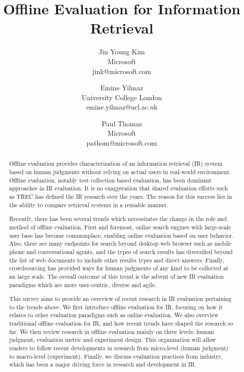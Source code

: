\documentclass[openany]{now} %
\title{Offline Evaluation for Information Retrieval}
\author{
	Jin Young Kim \\
	Microsoft \\
	jink@microsoft.com
	\and
	Emine Yilmaz \\
	University College London \\
	emine.yilmaz@ucl.ac.uk
	\and
	Paul Thomas \\
	Microsoft \\
	pathom@microsoft.com
}
\begin{document}

\frontmatter  %

\maketitle

\tableofcontents

\mainmatter

\begin{abstract}
Offline evaluation provides characterization of an information retrieval (IR) system based on human judgments without relying on actual users in real-world environment. Offline evaluation, notably test collection based evaluation, has been dominant approaches in IR evaluation. It is no exaggeration that shared evaluation efforts such as TREC has defined the IR research over the years. The reason for this success lies in the ability to compare retrieval systems in a reusable manner.

Recently, there has been several trends which necessitates the change in the role and method of offline evaluation. First and foremost, online search engines with large-scale user base has become commonplace, enabling online evaluation based on user behavior. Also, there are many endpoints for search beyond desktop web browser such as mobile phone and conversational agents, and the types of search results has diversified beyond the list of web documents to include other results types and direct answers. Finally, crowdsourcing has provided ways for human judgments of any kind to be collected at an large scale. The overall outcome of this trend is the advent of new IR evaluation paradigms which are more user-centric, diverse and agile.

This survey aims to provide an overview of recent research in IR evaluation pertaining to the trends above. We first introduce offline evaluation for IR, focusing on how it relates to other evaluation paradigms such as online evaluation. We also overview traditional offline evaluation for IR, and how recent trends have shaped the research so far. We then review research in offline evaluation mainly on three levels: human judgment, evaluation metric and experiment design. This organization will allow readers to follow recent developments in research from micro-level (human judgment) to macro-level (experiment). Finally, we discuss evaluation practices from industry, which has been a major driving force in research and development in IR.


\end{abstract}
\end{document}
